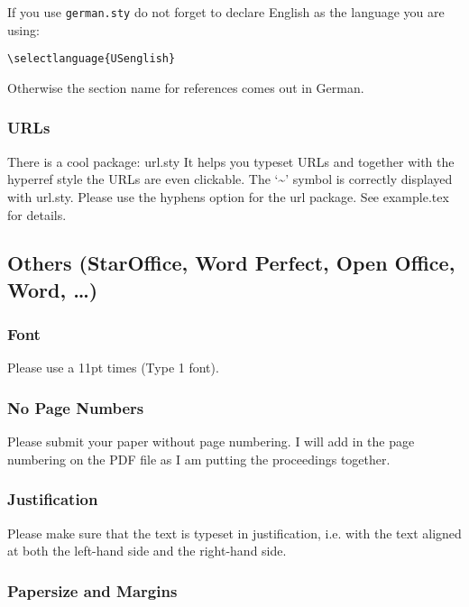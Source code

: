\documentclass[11pt,a4paper,fleqn]{article}
\begin{document}
If you use \verb+german.sty+ do not forget to declare English as the language
you are using:
\begin{verbatim}
\selectlanguage{USenglish}
\end{verbatim}
Otherwise the section name for references comes out in German.

\subsubsection{URLs}

There is a cool package: url.sty It helps you typeset URLs and together with the hyperref style the
URLs are even clickable. The `\~{}' symbol is correctly displayed with url.sty. Please use the
hyphens option for the url package. See example.tex for details.





\subsection{Others (StarOffice, Word Perfect, Open Office, Word, \ldots)}

\subsubsection{Font}

Please use a 11pt times (Type 1 font). 

\subsubsection{No Page Numbers}

Please submit your paper without page numbering.  I will add in
the page numbering on the PDF file as I am putting the
proceedings together.

\subsubsection{Justification}

Please make sure that the text is typeset in justification,
i.e. with the text aligned at both the left-hand side and the right-hand side.

\subsubsection{Papersize and Margins}
\label{margins}
\end{document}

